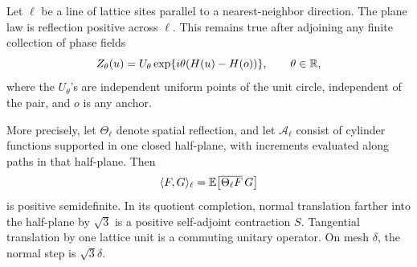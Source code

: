\begin{proposition}
\label{prop:reflection-positivity}
Let \(\ell\) be a line of lattice sites parallel to a nearest-neighbor direction.
The plane law is reflection positive across \(\ell\). This remains true after
adjoining any finite collection of phase fields
\begin{equation}
 \label{eq:auxiliary-phases}
 Z_\theta(u)=U_\theta\exp\{i\theta(H(u)-H(o))\},\qquad \theta\in\mathbb R,
\end{equation}
where the \(U_\theta\)'s are independent uniform points of the unit circle,
independent of the pair, and \(o\) is any anchor.

More precisely, let \(\Theta_\ell\) denote spatial reflection, and let
\(\mathcal A_\ell\) consist of cylinder functions supported in one closed
half-plane, with increments evaluated along paths in that half-plane. Then
\[
 \langle F,G\rangle_\ell
   =\mathbb E\big[\overline{\Theta_\ell F}\,G\big]
\]
is positive semidefinite. In its quotient completion, normal translation farther
into the half-plane by \(\sqrt3\) is a positive self-adjoint contraction \(S\).
Tangential translation by one lattice unit is a commuting unitary operator.
On mesh \(\delta\), the normal step is \(\sqrt3\delta\).
\end{proposition}


